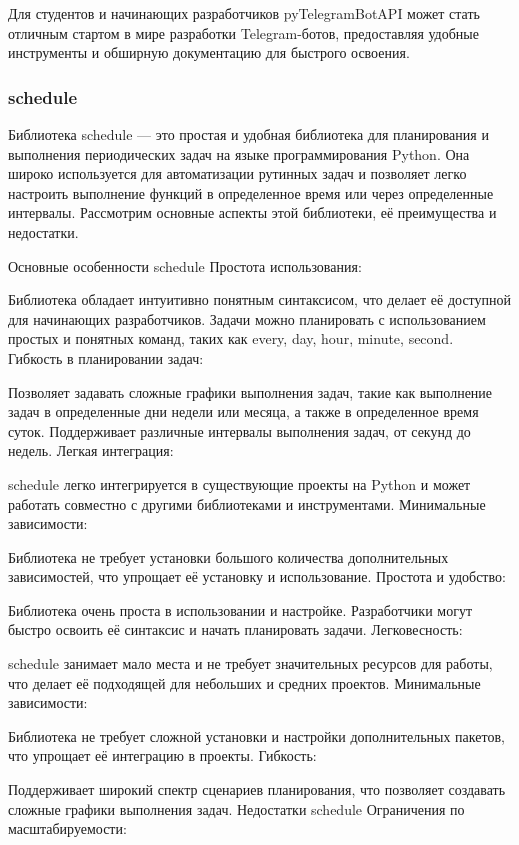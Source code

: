 Для студентов и начинающих разработчиков pyTelegramBotAPI может стать отличным стартом в мире разработки Telegram-ботов, предоставляя удобные инструменты и обширную документацию для быстрого освоения.

\subsubsection{schedule}
Библиотека schedule — это простая и удобная библиотека для планирования и выполнения периодических задач на языке программирования Python. Она широко используется для автоматизации рутинных задач и позволяет легко настроить выполнение функций в определенное время или через определенные интервалы. Рассмотрим основные аспекты этой библиотеки, её преимущества и недостатки.

Основные особенности schedule
Простота использования:

Библиотека обладает интуитивно понятным синтаксисом, что делает её доступной для начинающих разработчиков.
Задачи можно планировать с использованием простых и понятных команд, таких как every, day, hour, minute, second.
Гибкость в планировании задач:

Позволяет задавать сложные графики выполнения задач, такие как выполнение задач в определенные дни недели или месяца, а также в определенное время суток.
Поддерживает различные интервалы выполнения задач, от секунд до недель.
Легкая интеграция:

schedule легко интегрируется в существующие проекты на Python и может работать совместно с другими библиотеками и инструментами.
Минимальные зависимости:

Библиотека не требует установки большого количества дополнительных зависимостей, что упрощает её установку и использование.
Простота и удобство:

Библиотека очень проста в использовании и настройке. Разработчики могут быстро освоить её синтаксис и начать планировать задачи.
Легковесность:

schedule занимает мало места и не требует значительных ресурсов для работы, что делает её подходящей для небольших и средних проектов.
Минимальные зависимости:

Библиотека не требует сложной установки и настройки дополнительных пакетов, что упрощает её интеграцию в проекты.
Гибкость:

Поддерживает широкий спектр сценариев планирования, что позволяет создавать сложные графики выполнения задач.
Недостатки schedule
Ограничения по масштабируемости:

